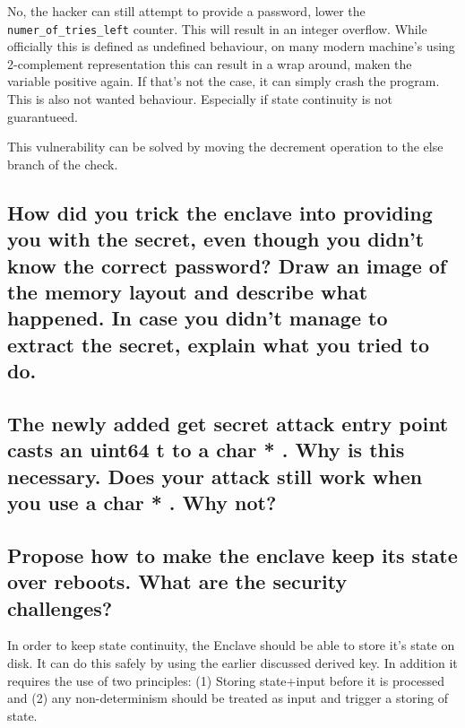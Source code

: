 \documentclass{article}
\begin{document}
No, the hacker can still attempt to provide a password, lower the
\texttt{numer\_of\_tries\_left} counter. This will result in an integer
overflow. While officially this is defined as undefined behaviour, on many
modern machine's using 2-complement representation this can result in a wrap
around, maken the variable positive again. If that's not the case, it can simply
crash the program. This is also not wanted behaviour. Especially if state
continuity is not guarantueed.

This vulnerability can be solved by moving the decrement operation to the else
branch of the check.

\subsection{How did you trick the enclave into providing you with the secret, even
  though you didn’t know the correct password?   Draw an image of the
  memory layout and describe what happened.  In case you didn’t manage
to extract the secret, explain what you tried to do.}
\subsection{The newly added
  get
  secret
  attack
  entry point casts an
  uint64
  t
  to
  a
  char *
  .  Why is this necessary.  Does your attack still work when you
  use a
  char *
  .  Why not?  }
\subsection{Propose how to make the enclave keep its state over reboots.  What are
the security challenges?}

In order to keep state continuity, the Enclave should be able to store it's
state on disk. It can do this safely by using the earlier discussed derived key.
In addition it requires the use of two principles: (1) Storing state+input before it
is processed and (2) any non-determinism should be treated as input and trigger
a storing of state.
\end{document}

